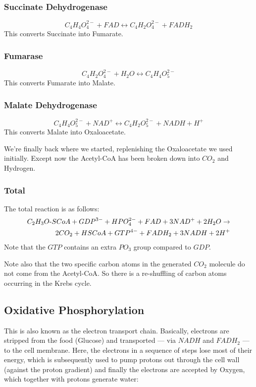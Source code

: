 \documentclass[a4paper,14pt]{extarticle}
\def\mhyphen{{\hbox{-}}}
\begin{document}
\subsubsection{Succinate Dehydrogenase}
\[
    C_4H_4O_4^{2-} + FAD \leftrightarrow C_4H_2O_4^{2-} + FADH_2
\]
This converts Succinate into Fumarate.

\subsubsection{Fumarase}
\[
    C_4H_2O_4^{2-} + H_2O \leftrightarrow C_4H_4O_5^{2-}
\]
This converts Fumarate into Malate.

\subsubsection{Malate Dehydrogenase}\label{sec_malate_dehydrogenase}
\[
    C_4H_4O_5^{2-} + NAD^+ \leftrightarrow C_4H_2O_5^{2-} + NADH + H^+
\]
This converts Malate into Oxaloacetate.

We're finally back where we started, replenishing the Oxaloacetate we used initially.
Except now the Acetyl-CoA has been broken down into $CO_2$ and Hydrogen.

\subsubsection{Total}
The total reaction is as follows:
\[
    \begin{split}
    C_2H_3O{\mhyphen}SCoA + GDP^{3-}+ HPO_4^{2-} + FAD + 3NAD^+ + 2H_2O \rightarrow \\
    2CO_2 + HSCoA + GTP^{4-} + FADH_2 + 3NADH + 2H^+
    \end{split}
\]
Note that the $GTP$ contains an extra $PO_3$ group compared to $GDP$.

Note also that the two specific carbon atoms in the generated $CO_2$ molecule do not come
from the Acetyl-CoA. So there is a re-shuffling of carbon atoms occurring in the Krebs
cycle.

\subsection{Oxidative Phosphorylation}
This is also known as the electron transport chain.  Basically, electrons are stripped
from the food (Glucose) and transported --- via $\mathit{NADH}$ and $\mathit{FADH_2}$ ---
to the cell membrane. Here, the electrons in a sequence of steps lose most of their
energy, which is subsequently used to pump protons out through the cell wall (against the
proton gradient) and finally the electrons are accepted by Oxygen, which together with
protons generate water:
\end{document}
